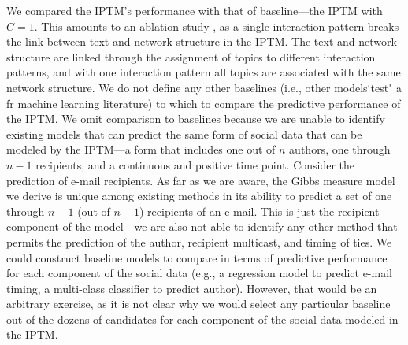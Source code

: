 \documentclass{article}
\begin{document}
We compared the IPTM's performance with that of baseline---the IPTM with $C=1$. This amounts to an ablation study \citep{richardson2006beyond,bilgic2010active}, as a single interaction pattern breaks the link between text and network structure in the IPTM. The text and network structure are linked through the assignment of topics to different interaction patterns, and with one interaction pattern all topics are associated with the same network structure. We do not define any other baselines (i.e., other models`test" a fr machine learning literature) to which to compare the predictive performance of the IPTM. We omit comparison to baselines because we are unable to identify existing models that can predict the same form of social data that can be modeled by the IPTM---a form that includes one out of $n$ authors, one through $n-1$ recipients, and a continuous and positive time point. Consider the prediction of e-mail recipients. As far as we are aware, the Gibbs measure model we derive is unique among existing methods in its ability to predict a set of one through $n-1$ (out of $n-1$) recipients of an e-mail. This is just the recipient component of the model---we are also not able to identify any other method that permits the prediction of the author, recipient multicast, and timing of ties. We could construct baseline models to compare in terms of predictive performance for each component of the social data (e.g., a regression model to predict e-mail timing, a multi-class classifier to predict author). However, that would be an arbitrary exercise, as it is not clear why we would select any particular baseline out of the dozens of candidates for each component of the social data modeled in the IPTM. 
\end{document}

